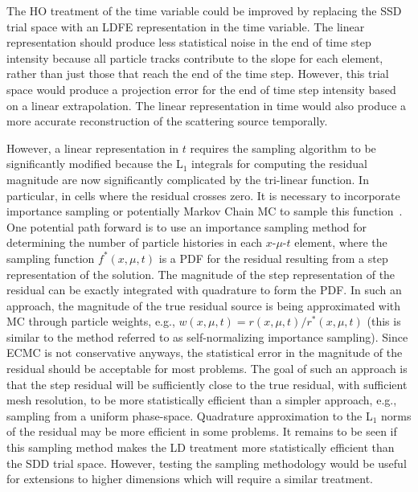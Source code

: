 The HO treatment of the time variable could be improved by replacing the SSD trial space
with an LDFE representation in the time variable. The linear representation should produce
less statistical noise in the end of time step intensity  because all particle tracks
contribute to the slope for each element, rather than just those that reach the end of the
time step.  However, this trial space would produce a projection error for the end of time step
intensity based on a linear extrapolation.  The
linear representation in time would also produce a more accurate reconstruction of the
scattering source temporally. 

However, a linear representation in $t$ requires the sampling
algorithm to be significantly modified because the L$_1$ integrals for computing the
residual magnitude are now significantly complicated by the tri-linear function.  In
particular, in cells where the residual crosses zero.  It is
necessary to incorporate importance sampling or potentially Markov Chain MC to sample this
function~\cite{shultis_mc}.  One potential path forward is to use an importance sampling
method for determining the number of particle histories in each $x$-$\mu$-$t$ element,
where the sampling function $f^*(x,\mu,t)$ is a PDF for the residual resulting from a step
representation of the solution.  The magnitude of the step representation of the residual
can be exactly integrated with quadrature to form the PDF.  In such an approach, the
magnitude of the true residual source is being
approximated with MC through particle weights, e.g., $w(x,\mu,t)=r(x,\mu,t)/r^*(x,\mu,t)$
(this is similar to the method referred to as self-normalizing importance sampling). Since ECMC is not
conservative anyways, the statistical error in the magnitude of the residual should be
acceptable for most problems.  The goal of such an approach is
that the step residual will be sufficiently close to the true residual, with sufficient
mesh resolution, to be more statistically efficient than a simpler approach, e.g.,
sampling from a uniform phase-space.  Quadrature approximation to the L$_1$ norms of the
residual may be more efficient in some problems. It remains to be seen if this sampling
method makes the LD treatment more statistically efficient than the SDD trial space.
However, testing the sampling methodology would be useful
for extensions to higher dimensions which will require a similar treatment.



